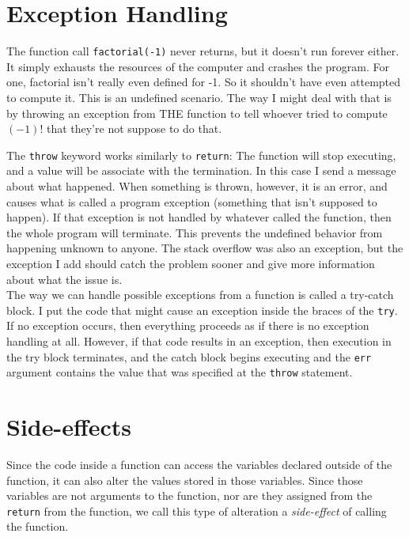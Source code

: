\section{Exception Handling}

The function call \texttt{factorial(-1)} never returns, but it doesn't run forever either. It simply exhausts the resources of the computer and crashes the program. For one, factorial isn't really even defined for -1. So it shouldn't have even attempted to compute it. This is an undefined scenario. The way I might deal with that is by throwing an exception from THE function to tell whoever tried to compute \((-1)!\) that they're not suppose to do that.\\


The \texttt{throw} keyword works similarly to \texttt{return}: The function will stop executing, and a value will be associate with the termination. In this case I send a message about what happened. When something is thrown, however, it is an error, and causes what is called a program exception (something that isn't supposed to happen). If that exception is not handled by whatever called the function, then the whole program will terminate. This prevents the undefined behavior from happening unknown to anyone. The stack overflow was also an exception, but the exception I add should catch the problem sooner and give more information about what the issue is.\\

The way we can handle possible exceptions from a function is called a try-catch block. I put the code that might cause an exception inside the braces of the \texttt{try}. If no exception occurs, then everything proceeds as if there is no exception handling at all. However, if that code results in an exception, then execution in the try block terminates, and the catch block begins executing and the \texttt{err} argument contains the value that was specified at the \texttt{throw} statement.\\


\section{Side-effects}

Since the code inside a function can access the variables declared outside of the function, it can also alter the values stored in those variables. Since those variables are not arguments to the function, nor are they assigned from the \texttt{return} from the function, we call this type of alteration a \textit{side-effect} of calling the function.

